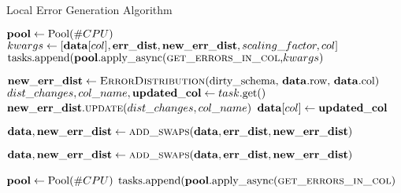 \begin{algorithm}[!t]
    \caption{Local Error Generation Algorithm}\label{alg:local_generator}
    \begin{algorithmic}[1] 
	  
	  
	  \STATE $\mathbf{pool} \leftarrow \text{Pool}(\#CPU)$
	   {
	    \STATE $kwargs \leftarrow [\mathbf{data}[col], \mathbf{err\_dist}, \mathbf{new\_err\_dist}, scaling\_factor, col]$ 
        \STATE $\text{tasks.append(\ensuremath{\mathbf{pool}}.apply\_async(\textsc{get\_errors\_in\_col},} kwargs\text{)}$ 
      }\ENDFOR 
      
	  \STATE $\mathbf{new\_err\_dist} \leftarrow \text{\textsc{ErrorDistribution}(dirty\_schema, \ensuremath{\mathbf{data}}.row, \ensuremath{\mathbf{data}}.col)}$
	   {
        \STATE $dist\_changes, col\_name, \mathbf{updated\_col} \leftarrow task\text{.get()}$ 
        \STATE $\mathbf{new\_err\_dist}.\textsc{update}(dist\_changes, col\_name)$ 
        \STATE $\mathbf{data}[col] \leftarrow \mathbf{updated\_col}$ 
      }\ENDFOR 
      
      \STATE $\mathbf{data}, \mathbf{new\_err\_dist} \leftarrow \textsc{add\_swaps}(\mathbf{data}, \mathbf{err\_dist}, \mathbf{new\_err\_dist})$ 
      
      \STATE $\mathbf{data}, \mathbf{new\_err\_dist} \leftarrow \textsc{add\_swaps}(\mathbf{data}, \mathbf{err\_dist}, \mathbf{new\_err\_dist})$ 
      
    
    
	  
	  \STATE $\mathbf{pool} \leftarrow \text{Pool}(\#CPU)$
	   {
        \STATE $\text{tasks.append(\ensuremath{\mathbf{pool}}.apply\_async(\textsc{get\_errors\_in\_col})}$ 
      }\ENDFOR 
      

\end{algorithmic}
\end{algorithm}
